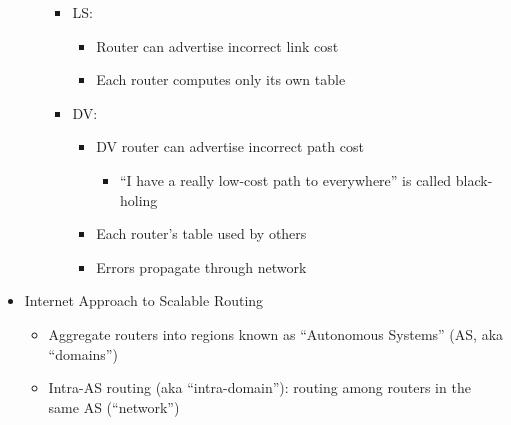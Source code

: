 \begin{itemize}
\begin{itemize}
        \begin{itemize}

          \item LS:

            \begin{itemize}

              \item Router can advertise incorrect link cost

              \item Each router computes only its own table

            \end{itemize}

          \item DV:

            \begin{itemize}

              \item DV router can advertise incorrect path cost

                \begin{itemize}

                  \item ``I have a really low-cost path to everywhere'' is called black-holing

                \end{itemize}

              \item Each router's table used by others

              \item Errors propagate through network

            \end{itemize}

        \end{itemize}

    \end{itemize}

  \item Internet Approach to Scalable Routing

    \begin{itemize}

      \item Aggregate routers into regions known as ``Autonomous Systems'' (AS, aka ``domains'')

      \item Intra-AS routing (aka ``intra-domain''): routing among routers in the same AS (``network'')


\end{itemize}
\end{itemize}
